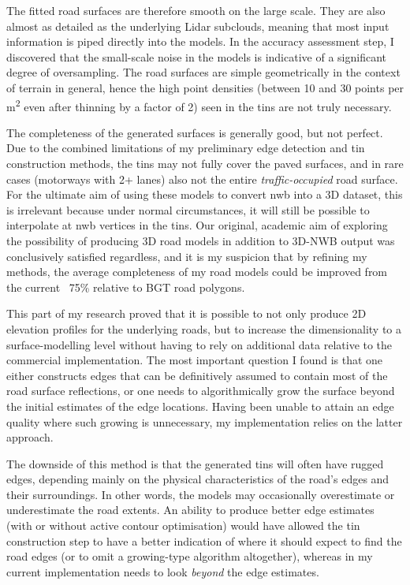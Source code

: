 The fitted road surfaces are therefore smooth on the large scale. They are also almost as detailed as the underlying Lidar subclouds, meaning that most input information is piped directly into the models. In the accuracy assessment step, I discovered that the small-scale noise in the models is indicative of a significant degree of oversampling. The road surfaces are simple geometrically in the context of terrain in general, hence the high point densities (between 10 and 30 points per m\textsuperscript{2} even after thinning by a factor of 2) seen in the \ac{tin}s are not truly necessary.

The completeness of the generated surfaces is generally good, but not perfect. Due to the combined limitations of my preliminary edge detection and \ac{tin} construction methods, the \ac{tin}s may not fully cover the paved surfaces, and in rare cases (motorways with 2+ lanes) also not the entire \textit{traffic-occupied} road surface. For the ultimate aim of using these models to convert \ac{nwb} into a 3D dataset, this is irrelevant because under normal circumstances, it will still be possible to interpolate at \ac{nwb} vertices in the \ac{tin}s. Our original, academic aim of exploring the possibility of producing 3D road models in addition to 3D-NWB output was conclusively satisfied regardless, and it is my suspicion that by refining my methods, the average completeness of my road models could be improved from the current ~75\% relative to BGT road polygons.

This part of my research proved that it is possible to not only produce 2D elevation profiles for the underlying roads, but to increase the dimensionality to a surface-modelling level without having to rely on additional data relative to the commercial implementation. The most important question I found is that one either constructs edges that can be definitively assumed to contain most of the road surface reflections, or one needs to algorithmically grow the surface beyond the initial estimates of the edge locations. Having been unable to attain an edge quality where such growing is unnecessary, my implementation relies on the latter approach.

The downside of this method is that the generated \ac{tin}s will often have rugged edges, depending mainly on the physical characteristics of the road's edges and their surroundings. In other words, the models may occasionally overestimate or underestimate the road extents. An ability to produce better edge estimates (with or without active contour optimisation) would have allowed the \ac{tin} construction step to have a better indication of where it should expect to find the road edges (or to omit a growing-type algorithm altogether), whereas in my current implementation needs to look \textit{beyond} the edge estimates.


